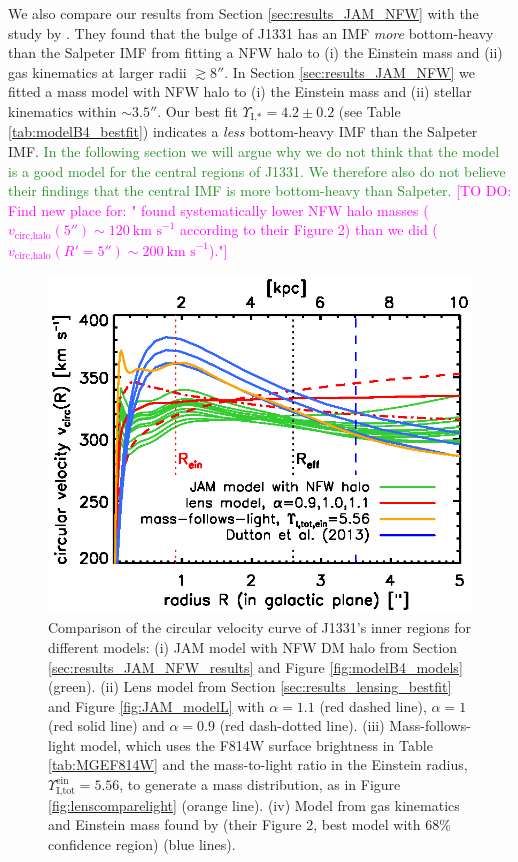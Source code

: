 \documentclass[useAMS,usenatbib]{mnras}
\newcommand{\Wilma}[1]{\textcolor{Magenta}{#1}}
\newcommand{\NEW}[1]{\textcolor{ForestGreen}{#1}}
\begin{document}
We also compare our results from Section \ref{sec:results_JAM_NFW} with the study by \citet{SWELLSV}. They found that the bulge of J1331 has an IMF \emph{more} bottom-heavy than the Salpeter IMF from fitting a NFW halo to (i) the Einstein mass and (ii) gas kinematics at larger radii $\gtrsim 8''$. In Section \ref{sec:results_JAM_NFW} we fitted a mass model with NFW halo to (i) the Einstein mass and (ii) stellar kinematics within $\sim 3.5''$. Our best fit $\Upsilon_\text{I,*} = 4.2 \pm 0.2$ (see Table \ref{tab:modelB4_bestfit}) indicates a \emph{less} bottom-heavy IMF than the Salpeter IMF. \NEW{In the following section we will argue why we do not think that the \cite{SWELLSV} model is a good model for the central regions of J1331. We therefore also do not believe their findings that the central IMF is more bottom-heavy than Salpeter.} \Wilma{[TO DO: Find new place for: "\cite{SWELLSV} found systematically lower NFW halo masses ($v_\text{circ,halo}(5'') \sim 120~\text{km s}^{-1}$ according to their Figure 2) than we did ($v_\text{circ,halo}(R'=5'') \sim 200~\text{km s}^{-1}$)."]}


\begin{figure}
\centering
\includegraphics[width=0.9\linewidth]{fig/B4_jam_profiles_errors_short_vcirc.ps}
\caption{Comparison of the circular velocity curve of J1331's inner regions for different models: (i) JAM model with NFW DM halo from Section \ref{sec:results_JAM_NFW_results} and Figure \ref{fig:modelB4_models} (green). (ii) Lens model from Section \ref{sec:results_lensing_bestfit} and Figure \ref{fig:JAM_modelL} with $\alpha = 1.1$ (red dashed line), $\alpha = 1$ (red solid line) and $\alpha=0.9$ (red dash-dotted line). (iii) Mass-follows-light model, which uses the F814W surface brightness in Table \ref{tab:MGEF814W} and the mass-to-light ratio in the Einstein radius, $\Upsilon^\text{ein}_\text{I,tot} = 5.56$, to generate a mass distribution, as in Figure \ref{fig:lenscomparelight} (orange line).  (iv) Model from gas kinematics and Einstein mass found by \citet{SWELLSV} (their Figure 2, best model with 68\% confidence region) (blue lines).}
\label{fig:vcirc_comparison}
\end{figure}
\end{document}
